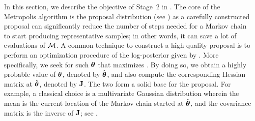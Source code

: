 In this section, we describe the objective of Stage~2 in .
The core of the Metropolis algorithm is the proposal distribution (see ) as a carefully constructed proposal can significantly reduce the number of steps needed for a Markov chain to start producing representative samples; in other words, it can save a lot of evaluations of $\model$.
A common technique to construct a high-quality proposal is to perform an optimization procedure of the log-posterior given by . More specifically, we seek for such ${\boldsymbol\theta}$ that maximizes .
By doing so, we obtain a highly probable value of ${\boldsymbol\theta}$, denoted by $\hat{{\boldsymbol\theta}}$, and also compute the corresponding Hessian matrix at $\hat{{\boldsymbol\theta}}$, denoted by $\mathbf{J}$. The two form a solid base for the proposal.
For example, a classical choice is a multivariate Gaussian distribution wherein the mean is the current location of the Markov chain started at $\hat{{\boldsymbol\theta}}$, and the covariance matrix is the inverse of $\mathbf{J}$; see \cite{gelman2004, bernardo2007}.

